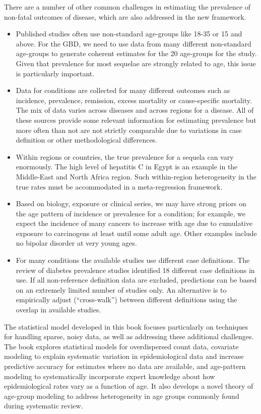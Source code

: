 There are a number of other common challenges in estimating the
prevalence of non-fatal outcomes of disease, which are also addressed
in the new framework.
\begin{itemize}
\item Published studies often use non-standard age-groups like 18-35
or 15 and above.  For the GBD, we need to use data from many different
non-standard age-groups to generate coherent estimates for the 20
age-groups for the study.  Given that prevalence for most sequelae are
strongly related to age, this issue is particularly important.

\item Data for conditions are collected for many different outcomes
such as incidence, prevalence, remission, excess mortality or
cause-specific mortality.  The mix of data varies across diseases and
across regions for a disease.  All of these sources provide some
relevant information for estimating prevalence but more often than not
are not strictly comparable due to variations in case definition or
other methodological differences.

\item Within regions or
countries, the true prevalence for a sequela can vary enormously. The
high level of hepatitis C in Egypt is an example in the Middle-East
and North Africa region.  Such within-region heterogeneity in the true
rates must be accommodated in a meta-regression framework.

\item Based on biology, exposure or clinical series, we may have strong
priors on the age pattern of incidence or prevalence for a condition;
for example, we expect the incidence of many cancers to increase with
age due to cumulative exposure to carcinogens at least until some
adult age.  Other examples include no bipolar disorder at very young
ages.  

\item For many conditions the available studies use
different case definitions.  The review of diabetes prevalence studies
identified 18 different case definitions in use.  If all non-reference
definition data are excluded, predictions can be based on an extremely
limited number of studies only.  An alternative is to empirically
adjust (“cross-walk”) between different definitions using the overlap
in available studies.
\end{itemize}

The statistical model developed in this book focuses
particularly on techniques for handling sparse, noisy data, as well as
addressing these additional challenges.  The book explores statistical
models for overdispersed count data, covariate modeling to explain
systematic variation in epidemiological data and increase predictive
accuracy for estimates where no data are available, and age-pattern
modeling to systematically incorporate expert knowledge about how
epidemiological rates vary as a function of age.  It also develops a
novel theory of age-group modeling to address heterogeneity in age
groups commonly found during systematic review.

